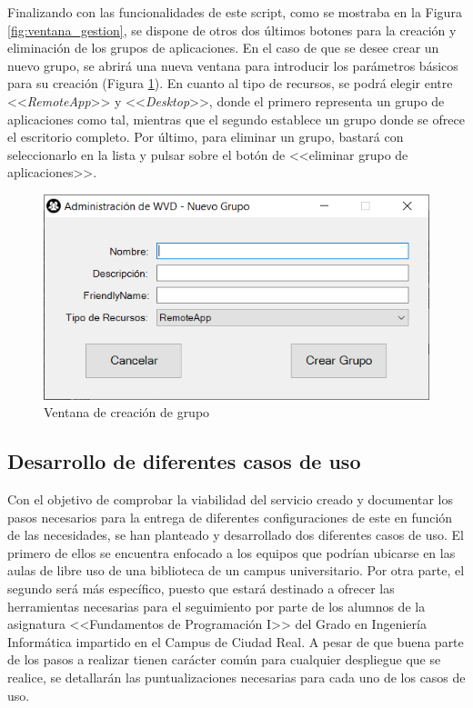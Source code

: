 \clearpage

Finalizando con las funcionalidades de este script, como se mostraba en la Figura \ref{fig:ventana_gestion}, se dispone de otros dos últimos botones para la creación y eliminación de los grupos de aplicaciones. En el caso de que se desee crear un nuevo grupo, se abrirá una nueva ventana para introducir los parámetros básicos para su creación (Figura \ref{fig:ventana_creargrupo}). En cuanto al tipo de recursos, se podrá elegir entre <<\textit{RemoteApp}>> y <<\textit{Desktop}>>, donde el primero representa un grupo de aplicaciones como tal, mientras que el segundo establece un grupo donde se ofrece el escritorio completo. Por último, para eliminar un grupo, bastará con seleccionarlo en la lista y pulsar sobre el botón de <<eliminar grupo de aplicaciones>>.

\begin{figure}[h]
  \centering
  \includegraphics[width=0.6\linewidth]{figures/images/script/ventana_creargrupo.PNG}
  \caption{Ventana de creación de grupo}
  \label{fig:ventana_creargrupo}
\end{figure}

\clearpage

\subsection{Desarrollo de diferentes casos de uso}
Con el objetivo de comprobar la viabilidad del servicio creado y documentar los pasos necesarios para la entrega de diferentes configuraciones de este en función de las necesidades, se han planteado y desarrollado dos diferentes casos de uso. El primero de ellos se encuentra enfocado a los equipos que podrían ubicarse en las aulas de libre uso de una biblioteca de un campus universitario. Por otra parte, el segundo será más específico, puesto que estará destinado a ofrecer las herramientas necesarias para el seguimiento por parte de los alumnos de la asignatura <<Fundamentos de Programación I>> del Grado en Ingeniería Informática impartido en el Campus de Ciudad Real. A pesar de que buena parte de los pasos a realizar tienen carácter común para cualquier despliegue que se realice, se detallarán las puntualizaciones necesarias para cada uno de los casos de uso.

